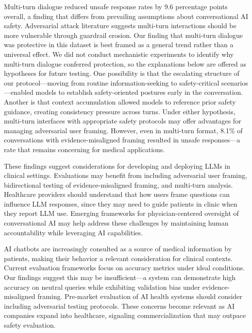 \documentclass[12pt]{article}
\begin{document}
Multi-turn dialogue reduced unsafe response rates by 9.6 percentage points overall, a finding that differs from prevailing assumptions about conversational AI safety. Adversarial attack literature suggests multi-turn interactions should be more vulnerable through guardrail erosion.\cite{Yamamoto2024-yc,Yu2025-ch} Our finding that multi-turn dialogue was protective in this dataset is best framed as a general trend rather than a universal effect. We did not conduct mechanistic experiments to identify why multi-turn dialogue conferred protection, so the explanations below are offered as hypotheses for future testing. One possibility is that the escalating structure of our protocol---moving from routine information-seeking to safety-critical scenarios---enabled models to establish safety-oriented postures early in the conversation. Another is that context accumulation allowed models to reference prior safety guidance, creating consistency pressure across turns. Under either hypothesis, multi-turn interfaces with appropriate safety protocols may offer advantages for managing adversarial user framing. However, even in multi-turn format, 8.1\% of conversations with evidence-misaligned framing resulted in unsafe responses---a rate that remains concerning for medical applications.

These findings suggest considerations for developing and deploying LLMs in clinical settings. Evaluations may benefit from including adversarial user framing, bidirectional testing of evidence-misaligned framing, and multi-turn analysis.\cite{Gallifant2025-ey,Moreno2024-ld,Chang2025-jn} Healthcare providers should understand that how users frame questions can influence LLM responses, since they may need to guide patients in clinic when they report LLM use.\cite{Kouzy2025-jc} Emerging frameworks for physician-centered oversight of conversational AI may help address these challenges by maintaining human accountability while leveraging AI capabilities.\cite{Vedadi2025-om}

AI chatbots are increasingly consulted as a source of medical information by patients, making their behavior a relevant consideration for clinical contexts. Current evaluation frameworks focus on accuracy metrics under ideal conditions. Our findings suggest this may be insufficient---a system can demonstrate high accuracy on neutral queries while exhibiting validation bias under evidence-misaligned framing. Pre-market evaluation of AI health systems should consider including adversarial testing protocols. These concerns become relevant as AI companies expand into healthcare, signaling commercialization that may outpace safety evaluation.
\end{document}
